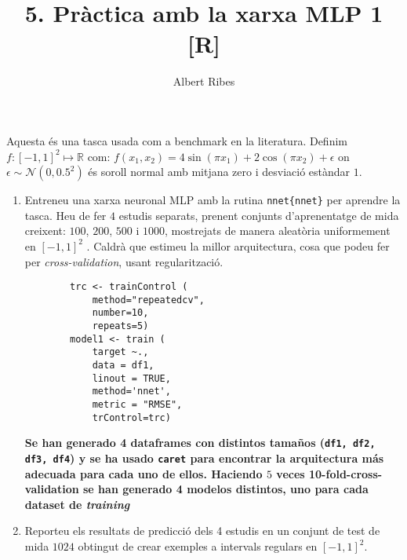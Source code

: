 \documentclass[a4paper]{article}
\author{Albert Ribes}
\title{\textbf{5. Pràctica amb la xarxa MLP 1 [R]}}
\begin{document}
    \maketitle

    Aquesta és una tasca usada com a benchmark en la literatura. Definim
    $f:
    [-1, 1]^2
    \longmapsto
    \mathbb{R} $
    com:
    $f(x_1, x_2) =
    4\sin(\pi x_1) +
    2\cos(\pi x_2 ) +
    \epsilon$
    on
    $\epsilon \sim \mathcal{N}(0, 0.5^2)$
    és soroll normal amb mitjana zero i desviació estàndar
    $1$.

    \begin{enumerate}

        \item Entreneu una xarxa neuronal MLP amb la rutina
        \texttt{nnet\{nnet\}}
        per aprendre la tasca. Heu de fer $4$
        estudis separats, prenent conjunts d'aprenentatge de mida creixent:
            $100$, $200$, $500$ i $1000$, mostrejats
        de manera aleatòria uniformement en
        $[-1, 1]^2$ .
        Caldrà que estimeu la millor arquitectura, cosa que
        podeu fer per \textit{cross-validation}, usant regularització.

        \begin{lstlisting}
        trc <- trainControl (
            method="repeatedcv",
            number=10,
            repeats=5)
        model1 <- train (
            target ~.,
            data = df1,
            linout = TRUE,
            method='nnet',
            metric = "RMSE",
            trControl=trc)
        \end{lstlisting}

        {\bfseries
        Se han generado 4 dataframes con distintos tamaños (\texttt{df1, df2, df3, df4}) y se ha usado \texttt{caret} para encontrar la arquitectura más adecuada para cada uno de ellos. Haciendo $5$ veces 10-fold-cross-validation se han generado 4 modelos distintos, uno para cada dataset de \textit{training}
        }

        \item Reporteu els resultats de predicció dels 4 estudis en un conjunt de test de mida $1024$
        obtingut de
        crear exemples a intervals regulars en
        $[-1, 1]^2$.


\end{enumerate}
\end{document}
